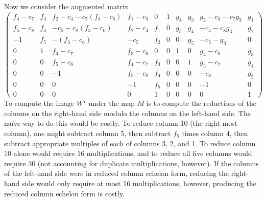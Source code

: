 Now we consider the augmented matrix
\[ \left( \begin{array}{rrrrr|rrrrr}
  f_4 - c_7 & f_3 & f_2 - c_4 - c_7(f_3 - c_6) & f_1 - c_3 &   0 & 1 & g_4 & g_3 & g_2 - c_3 - c_7g_3 & g_1 \\
  f_5 - c_8 & f_4 &     - c_5 - c_8(f_3 - c_6) & f_2 - c_4 & f_1 & 0 & g_5 & g_4 &     - c_4 - c_8g_3 & g_2 \\
        - 1 & f_5 &              - (f_3 - c_6) &     - c_5 & f_2 & 0 &   0 & g_5 &     - c_5    - g_3 &   0 \\
          0 &   1 & f_4 - c_7                  & f_3 - c_6 &   0 & 0 &   1 &   0 & g_4 - c_6          & g_3 \\ 
          0 &   0 & f_5 - c_8                  & f_4 - c_7 & f_3 & 0 &   0 &   1 & g_5 - c_7          & g_4 \\ 
          0 &   0 &       - 1                  & f_5 - c_8 & f_4 & 0 &   0 &   0 &     - c_8          & g_5 \\
          0 &   0 &         0                  &       - 1 & f_5 & 0 &   0 &   0 &       - 1          &   0 \\
          0 &   0 &         0                  &         0 &   1 & 0 &   0 &   0 &         0          &   1
\end{array} \right) \]
To compute the image $W^7$ under the map $M$ is to compute
the reductions of the columns on the right-hand side modulo the columns on the left-hand side.
The na\"ive way to do this would be costly.
To reduce column 10 (the right-most column), one might subtract column 5, then subtract $f_5$ times column 4,
then subtract appropriate multiples of each of columns 3, 2, and 1.
To reduce column 10 alone would require 16 multiplications, and to reduce all five columns would require 30
(not accounting for duplicate multiplications, however).
If the columns of the left-hand side were in reduced column echelon form,
reducing the right-hand side would only require at most 16 multiplications,
however, producing the reduced column echelon form is costly.

